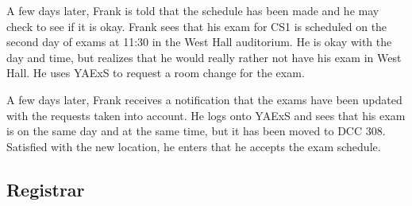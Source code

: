 \documentclass[11pt]{article}
\begin{document}
\begin{description}
A few days later, Frank is told that the schedule has been made and he may check to see if it is okay. Frank sees that his exam for CS1 is scheduled on the second day of exams at 11:30 in the West Hall auditorium. He is okay with the day and time, but realizes that he would really rather not have his exam in West Hall. He uses YAExS to request a room change for the exam.

A few days later, Frank receives a notification that the exams have been updated with the requests taken into account. He logs onto YAExS and sees that his exam is on the same day and at the same time, but it has been moved to DCC 308. Satisfied with the new location, he enters that he accepts the exam schedule.

\end{description}


\subsection{Registrar}  %
\end{document}
